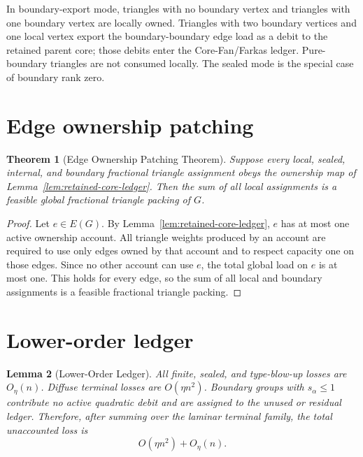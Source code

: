 \documentclass[11pt]{article}
\newtheorem{theorem}{Theorem}[section]
\newtheorem{lemma}[theorem]{Lemma}
\theoremstyle{definition}
\begin{document}
In boundary-export mode, triangles with no boundary vertex and triangles with one boundary vertex are locally owned. Triangles with two boundary vertices and one local vertex export the boundary-boundary edge load as a debit to the retained parent core; those debits enter the Core-Fan/Farkas ledger. Pure-boundary triangles are not consumed locally. The sealed mode is the special case of boundary rank zero.

\section{Edge ownership patching}

\begin{theorem}[Edge Ownership Patching Theorem]\label{thm:ownership-patching}
Suppose every local, sealed, internal, and boundary fractional triangle assignment obeys the ownership map of Lemma~\ref{lem:retained-core-ledger}. Then the sum of all local assignments is a feasible global fractional triangle packing of \(G\).
\end{theorem}

\begin{proof}
Let \(e\in E(G)\). By Lemma~\ref{lem:retained-core-ledger}, \(e\) has at most one active ownership account. All triangle weights produced by an account are required to use only edges owned by that account and to respect capacity one on those edges. Since no other account can use \(e\), the total global load on \(e\) is at most one. This holds for every edge, so the sum of all local and boundary assignments is a feasible fractional triangle packing.
\end{proof}

\section{Lower-order ledger}

\begin{lemma}[Lower-Order Ledger]\label{lem:lower-order}
All finite, sealed, and type-blow-up losses are \(O_\eta(n)\). Diffuse terminal losses are \(O(\eta n^2)\). Boundary groups with \(s_\alpha\le1\) contribute no active quadratic debit and are assigned to the unused or residual ledger. Therefore, after summing over the laminar terminal family, the total unaccounted loss is
\[
    O(\eta n^2)+O_\eta(n).
\]
\end{lemma}
\end{document}
